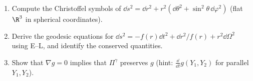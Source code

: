 \begin{exercises}
\begin{enumerate}[nosep]
\item Compute the Christoffel symbols of $\dd s^2=\dd r^2+r^2(\dd\theta^2+\sin^2\theta\,\dd\varphi^2)$ (flat $\R^3$ in spherical coordinates).
\item Derive the geodesic equations for $\dd s^2=-f(r)\dd t^2+\dd r^2/f(r)+r^2\dd\Omega^2$ using E--L, and identify the conserved quantities.
\item Show that $\nabla g=0$ implies that $\Pi^\gamma$ preserves $g$ (hint: $\frac{\dd}{\dd t}g(Y_1,Y_2)$ for parallel $Y_1,Y_2$).
\end{enumerate}
\end{exercises}

